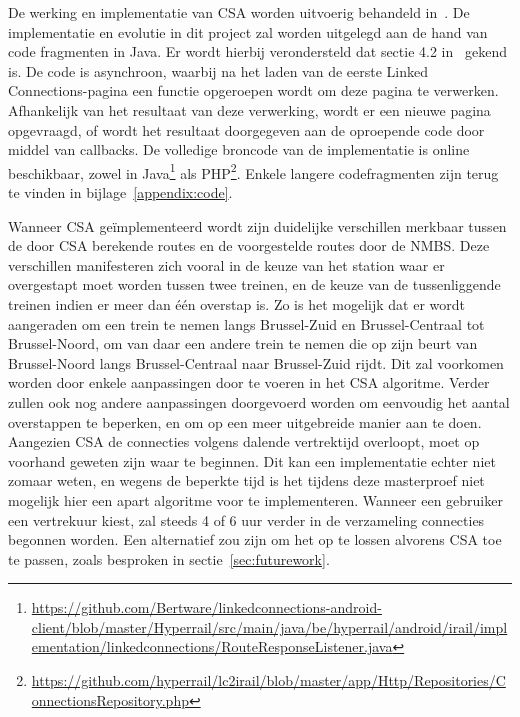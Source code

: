 De werking en implementatie van CSA worden uitvoerig behandeld in~\citep{strasser17}.
De implementatie en evolutie in dit project zal worden uitgelegd aan de hand van code fragmenten in Java. Er wordt hierbij verondersteld dat sectie 4.2 in~\cite{strasser17} gekend is. De code is asynchroon, waarbij na het laden van de eerste Linked Connections-pagina een  functie opgeroepen wordt om deze pagina te verwerken. Afhankelijk van het resultaat van deze verwerking, wordt er een nieuwe pagina opgevraagd, of wordt het resultaat doorgegeven aan de oproepende code door middel van callbacks. 
De volledige broncode van de implementatie is online beschikbaar, zowel in  Java\footnote{\url{https://github.com/Bertware/linkedconnections-android-client/blob/master/Hyperrail/src/main/java/be/hyperrail/android/irail/implementation/linkedconnections/RouteResponseListener.java}} als PHP\footnote{\url{https://github.com/hyperrail/lc2irail/blob/master/app/Http/Repositories/ConnectionsRepository.php}}. Enkele langere codefragmenten zijn terug te vinden in bijlage~\ref{appendix:code}.

Wanneer CSA geïmplementeerd wordt zijn duidelijke verschillen merkbaar tussen de door CSA berekende routes en de voorgestelde routes door de NMBS. Deze verschillen manifesteren zich vooral in de keuze van het station waar er overgestapt moet worden tussen twee treinen, en de keuze van de tussenliggende treinen indien er meer dan één overstap is. Zo is het mogelijk dat er wordt aangeraden om een trein te nemen langs Brussel-Zuid en Brussel-Centraal tot Brussel-Noord, om van daar een andere trein te nemen die op zijn beurt van Brussel-Noord langs Brussel-Centraal naar Brussel-Zuid rijdt. Dit zal voorkomen worden door enkele aanpassingen door te voeren in het CSA algoritme.
Verder zullen ook nog andere aanpassingen doorgevoerd worden om eenvoudig het aantal overstappen te beperken, en om op een meer uitgebreide manier aan  te doen. Aangezien CSA de connecties volgens dalende vertrektijd overloopt, moet op voorhand geweten zijn waar te beginnen. Dit kan een implementatie echter niet zomaar weten, en wegens de beperkte tijd is het tijdens deze masterproef niet mogelijk hier een apart algoritme voor te implementeren. Wanneer een gebruiker een vertrekuur kiest, zal steeds 4 of 6 uur verder in de verzameling connecties begonnen worden. Een alternatief zou zijn om het  op te lossen alvorens CSA toe te passen, zoals besproken in sectie~\ref{sec:futurework}.

